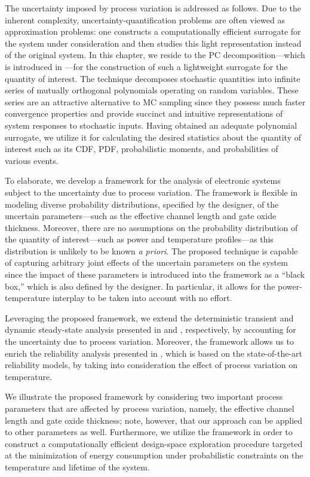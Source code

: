 The uncertainty imposed by process variation is addressed as follows. Due to the
inherent complexity, uncertainty-quantification problems are often viewed as
approximation problems: one constructs a computationally efficient surrogate for
the system under consideration and then studies this light representation
instead of the original system. In this chapter, we reside to the \ac{PC}
decomposition---which is introduced in ---for the
construction of such a lightweight surrogate for the quantity of interest. The
technique decomposes stochastic quantities into infinite series of mutually
orthogonal polynomials operating on random variables. These series are an
attractive alternative to \ac{MC} sampling since they possess much faster
convergence properties and provide succinct and intuitive representations of
system responses to stochastic inputs. Having obtained an adequate polynomial
surrogate, we utilize it for calculating the desired statistics about the
quantity of interest such as its \ac{CDF}, \ac{PDF}, probabilistic moments, and
probabilities of various events.

To elaborate, we develop a framework for the analysis of electronic systems
subject to the uncertainty due to process variation. The framework is flexible
in modeling diverse probability distributions, specified by the designer, of the
uncertain parameters---such as the effective channel length and gate oxide
thickness. Moreover, there are no assumptions on the probability distribution of
the quantity of interest---such as power and temperature profiles---as this
distribution is unlikely to be known \emph{a priori}. The proposed technique is
capable of capturing arbitrary joint effects of the uncertain parameters on the
system since the impact of these parameters is introduced into the framework as
a ``black box,'' which is also defined by the designer. In particular, it allows
for the power-temperature interplay to be taken into account with no effort.

Leveraging the proposed framework, we extend the deterministic transient and
dynamic steady-state analysis presented in  and
, respectively, by accounting for the
uncertainty due to process variation. Moreover, the framework allows us to
enrich the reliability analysis presented in , which
is based on the state-of-the-art reliability models, by taking into
consideration the effect of process variation on temperature.

We illustrate the proposed framework by considering two important process
parameters that are affected by process variation, namely, the effective channel
length and gate oxide thickness; note, however, that our approach can be applied
to other parameters as well. Furthermore, we utilize the framework in order to
construct a computationally efficient design-space exploration procedure
targeted at the minimization of energy consumption under probabilistic
constraints on the temperature and lifetime of the system.

